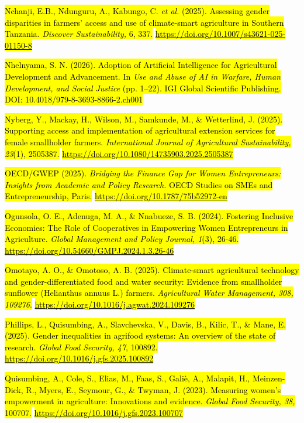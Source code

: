 \documentclass[
]{article}
\begin{document}
\hl{Nchanji, E.B., Ndunguru, A., Kabungo, C. \emph{et al.} (2025).
Assessing gender disparities in farmers' access and use of climate-smart
agriculture in Southern Tanzania. \emph{Discover Sustainability,} 6,
337.}
\href{https://doi.org/10.1007/s43621-025-01150-8}{\hl{https://doi.org/10.1007/s43621-025-01150-8}}

\hl{Nhelnyama, S. N. (2026). Adoption of Artificial Intelligence for
Agricultural Development and Advancement. In \emph{Use and Abuse of AI
in Warfare, Human Development, and Social Justice} (pp. 1--22). IGI
Global Scientific Publishing. DOI: 10.4018/979-8-3693-8866-2.ch001}

\hl{Nyberg, Y., Mackay, H., Wilson, M., Samkunde, M., \& Wetterlind, J.
(2025). Supporting access and implementation of agricultural extension
services for female smallholder farmers. \emph{International Journal of
Agricultural Sustainability, 23}(1), 2505387.}
\href{https://doi.org/10.1080/14735903.2025.2505387}{\hl{https://doi.org/10.1080/14735903.2025.2505387}}

\hl{OECD/GWEP (2025). \emph{Bridging the Finance Gap for Women
Entrepreneurs: Insights from Academic and Policy Research.} OECD Studies
on SMEs and Entrepreneurship, Paris.}
\href{https://doi.org/10.1787/75b52972-en}{\hl{https://doi.org/10.1787/75b52972-en}}

\hl{Ogunsola, O. E., Adenuga, M. A., \& Nnabueze, S. B. (2024).
Fostering Inclusive Economies: The Role of Cooperatives in Empowering
Women Entrepreneurs in Agriculture. \emph{Global Management and Policy
Journal, 1}(3), 26-46.}
\href{https://doi.org/10.54660/GMPJ.2024.1.3.26-46}{\hl{https://doi.org/10.54660/GMPJ.2024.1.3.26-46}}

\hl{Omotayo, A. O., \& Omotoso, A. B. (2025). Climate-smart agricultural
technology and gender-differentiated food and water security: Evidence
from smallholder sunflower (Helianthus annuus L.) farmers.
\emph{Agricultural Water Management, 308, 109276}.}
\href{https://doi.org/10.1016/j.agwat.2024.109276}{\hl{https://doi.org/10.1016/j.agwat.2024.109276}}

\hl{Phillips, L., Quisumbing, A., Slavchevska, V., Davis, B., Kilic, T.,
\& Mane, E. (2025). Gender inequalities in agrifood systems: An overview
of the state of research. \emph{Global Food Security, 47}, 100892.}
\href{https://doi.org/10.1016/j.gfs.2025.100892}{\hl{https://doi.org/10.1016/j.gfs.2025.100892}}

\hl{Quisumbing, A., Cole, S., Elias, M., Faas, S., Galiè, A., Malapit,
H., Meinzen-Dick, R., Myers, E., Seymour, G., \& Twyman, J. (2023).
Measuring women's empowerment in agriculture: Innovations and evidence.
\emph{Global Food Security, 38,} 100707.}
\href{https://doi.org/10.1016/j.gfs.2023.100707}{\hl{https://doi.org/10.1016/j.gfs.2023.100707}}
\end{document}
